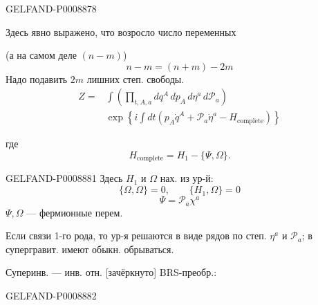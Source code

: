 \begin{GelfandAdjacentEvidence}{GELFAND-P000887}{8}


Здесь явно выражено, что возросло число переменных

(а на самом деле $(n-m)$)
\begin{equation*}
n-m=(n+m)-2m
\end{equation*}
Надо подавить $2m$ лишних степ. свободы.
\begin{equation*}
\begin{aligned}
Z={}&\int\left(\prod_{t,A,a}dq^A\,dp_A\,d\eta^a\,d\mathcal P_a\right)\\
&{}\exp\left\{i\int dt\left(p_A\dot q^A+\mathcal P_a\dot\eta^a-H_{\mathrm{complete}}\right)\right\}
\end{aligned}
\tag{8}
\end{equation*}
\end{GelfandAdjacentEvidence}


где
\begin{equation*}
H_{\mathrm{complete}}=H_1-\{\Psi,\Omega\}.
\tag{9}
\end{equation*}


\begin{GelfandAdjacentEvidence}{GELFAND-P000888}{1}
Здесь $H_1$ и $\Omega$ нах. из ур-й:
\begin{equation*}
\{\Omega,\Omega\}=0,\qquad \{H_1,\Omega\}=0
\tag{10}
\end{equation*}
\begin{equation*}
\Psi=\mathcal P_a\chi^a
\tag{11}
\end{equation*}
$\Psi,\Omega$ --- фермионные перем.

Если связи 1-го рода, то ур-я решаются в виде рядов по степ. $\eta^a$ и $\mathcal P_a$; в супергравит. имеют обыкн. обрываться.

Суперинв. --- инв. отн. [зачёркнуто] BRS-преобр.:
\end{GelfandAdjacentEvidence}
\begin{GelfandAdjacentEvidence}{GELFAND-P000888}{2}


\end{GelfandAdjacentEvidence}

